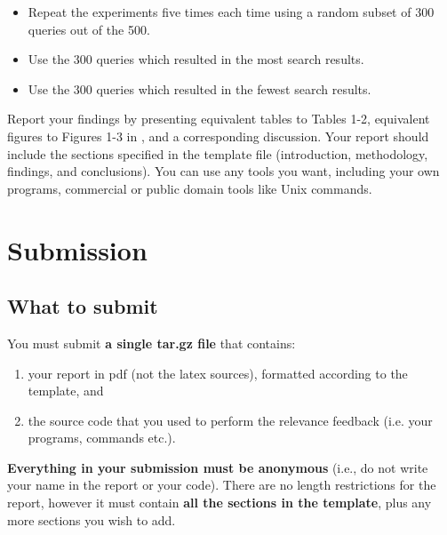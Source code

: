 \documentclass[10pt]{article}
\begin{document}
\begin{itemize}
\item Repeat the experiments five times each time using a random subset of 300 queries out of the 500.
\item Use the 300 queries which resulted in the most search results.
\item Use the 300 queries which resulted in the fewest search results.
\end{itemize}

Report your findings by presenting equivalent tables to Tables 1-2, equivalent figures to Figures 1-3 in \cite{LawLee1998}, and a corresponding discussion. Your report should include the sections specified in the template file (introduction, methodology, findings, and conclusions). You can use any tools you want, including your own programs, commercial or public domain tools like Unix commands. 


\section{Submission}
\subsection{What to submit}
You must submit \textbf{a single tar.gz file} that contains: 
\begin{enumerate}
\item your report in pdf (not the latex sources), formatted according to the template, and 
\item the source code that you used to perform the relevance feedback (i.e. your programs, commands etc.).
\end{enumerate}
\textbf{Everything in your submission must be anonymous} (i.e., do not write your name in the report or your code). There are no length restrictions for the report, however it must contain \textbf{all the sections in the template}, plus any more sections you wish to add. 
\end{document}

